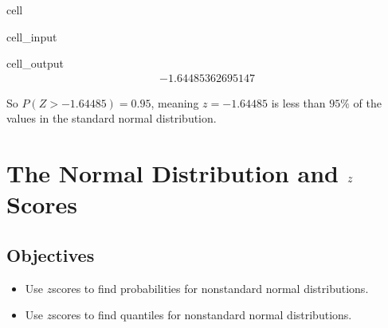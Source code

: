 \documentclass[letterpaper,10pt,english]{jupyterBook}
\begin{document}
\begin{sphinxuseclass}{cell}\begin{sphinxVerbatimInput}

\begin{sphinxuseclass}{cell_input}
\begin{sphinxVerbatim}[commandchars=\\\{\}]
\end{sphinxVerbatim}

\end{sphinxuseclass}\end{sphinxVerbatimInput}
\begin{sphinxVerbatimOutput}

\begin{sphinxuseclass}{cell_output}\begin{equation*}
\begin{split}-1.64485362695147\end{split}
\end{equation*}
\end{sphinxuseclass}\end{sphinxVerbatimOutput}

\end{sphinxuseclass}
\sphinxAtStartPar
So \(P(Z > -1.64485) = 0.95\), meaning \(z = -1.64485\) is less than \(95\%\) of the values in the standard normal distribution.

\sphinxstepscope


\section{The Normal Distribution and \protect\(z\protect\)\sphinxhyphen{}Scores}
\label{\detokenize{Ch4 The Normal Distribution and the Central Limit Theorem/4.3 The Normal Distribution and z-scores:the-normal-distribution-and-z-scores}}\label{\detokenize{Ch4 The Normal Distribution and the Central Limit Theorem/4.3 The Normal Distribution and z-scores::doc}}

\subsection{Objectives}
\label{\detokenize{Ch4 The Normal Distribution and the Central Limit Theorem/4.3 The Normal Distribution and z-scores:objectives}}\begin{itemize}
\item {} 
\sphinxAtStartPar
Use \(z\)\sphinxhyphen{}scores to find probabilities for non\sphinxhyphen{}standard normal distributions.

\item {} 
\sphinxAtStartPar
Use \(z\)\sphinxhyphen{}scores to find quantiles for non\sphinxhyphen{}standard normal distributions.

\end{itemize}
\end{document}

